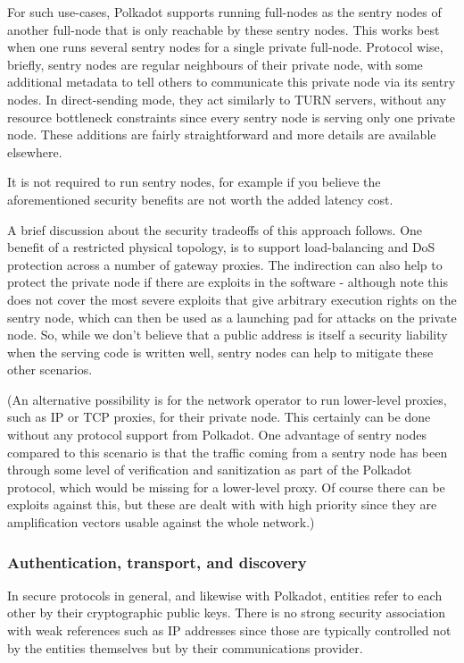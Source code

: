 For such use-cases, Polkadot supports running full-nodes as the sentry nodes of
another full-node that is only reachable by these sentry nodes. This works best
when one runs several sentry nodes for a single private full-node. Protocol
wise, briefly, sentry nodes are regular neighbours of their private node, with
some additional metadata to tell others to communicate this private node via
its sentry nodes. In direct-sending mode, they act similarly to TURN servers,
without any resource bottleneck constraints since every sentry node is serving
only one private node. These additions are fairly straightforward and more
details are available elsewhere.

It is not required to run sentry nodes, for example if you believe the
aforementioned security benefits are not worth the added latency cost.

A brief discussion about the security tradeoffs of this approach follows. One
benefit of a restricted physical topology, is to support load-balancing and DoS
protection across a number of gateway proxies. The indirection can also help to
protect the private node if there are exploits in the software - although note
this does not cover the most severe exploits that give arbitrary execution
rights on the sentry node, which can then be used as a launching pad for
attacks on the private node. So, while we don't believe that a public address
is itself a security liability when the serving code is written well, sentry
nodes can help to mitigate these other scenarios.

(An alternative possibility is for the network operator to run lower-level
proxies, such as IP or TCP proxies, for their private node. This certainly can
be done without any protocol support from Polkadot. One advantage of sentry
nodes compared to this scenario is that the traffic coming from a sentry node
has been through some level of verification and sanitization as part of the
Polkadot protocol, which would be missing for a lower-level proxy. Of course
there can be exploits against this, but these are dealt with with high priority
since they are amplification vectors usable against the whole network.)

\subsubsection{Authentication, transport, and discovery} \label{sec:net_lowlevel}

In secure protocols in general, and likewise with Polkadot, entities refer to each other by their cryptographic public keys. There is no strong security association with weak references such as IP addresses since those are typically controlled not by the entities themselves but by their communications provider.

